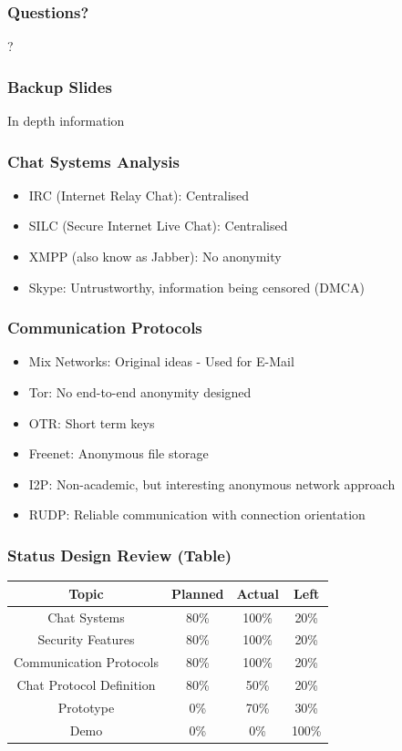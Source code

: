 \documentclass{beamer}
\begin{document}
\frame
{
  \frametitle{Questions?}
  \begin{center}
  ?
  \end{center}
}

\frame
{
  \frametitle{Backup Slides}
  \begin{center}
  In depth information
  \end{center}
}

\frame
{
  \frametitle{Chat Systems Analysis}
  \begin{itemize}
          \item IRC (Internet Relay Chat): Centralised
          \item SILC (Secure Internet Live Chat): Centralised
          \item XMPP (also know as Jabber): No anonymity
          \item Skype: Untrustworthy, information being censored (DMCA)
   \end{itemize}
}

\frame
{
  \frametitle{Communication Protocols}
    \begin{itemize}
        \item Mix Networks: Original ideas - Used for E-Mail
        \item Tor: No end-to-end anonymity designed
        \item OTR: Short term keys
        \item Freenet: Anonymous file storage
        \item I2P: Non-academic, but interesting anonymous network approach
        \item RUDP: Reliable communication with connection orientation
    \end{itemize}
}

\frame
{
    \frametitle{Status Design Review (Table)}
    \begin{center}
    \begin{tabular}{|c|c|c|c|}
    \hline
    Topic & Planned & Actual & Left\\
    \hline
    Chat Systems & 80\% & 100\% & 20\%\\
    \hline
    Security Features & 80\% & 100\% & 20\%\\
    \hline
    Communication Protocols & 80\% & 100\% & 20\%\\
    \hline
    Chat Protocol Definition & 80\% & 50\% & 20\%\\
    \hline
    Prototype & 0\% & 70\% & 30\%\\
    \hline
    Demo & 0\% & 0\% & 100\%\\
    \hline
    \end{tabular}
    \end{center}
}
\end{document}
